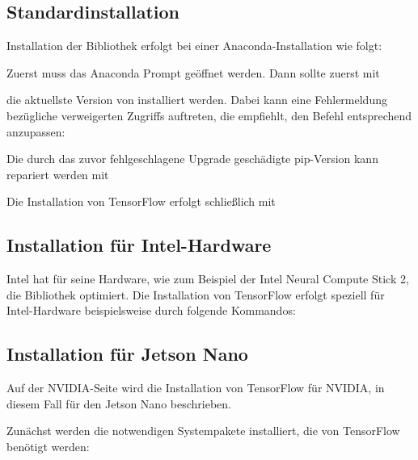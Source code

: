 \subsection{Standardinstallation}



Installation der Bibliothek erfolgt bei einer Anaconda-Installation wie folgt:

Zuerst muss das Anaconda Prompt geöffnet werden. Dann sollte zuerst mit

\medskip 
{}
\medskip

die aktuellste Version von  installiert werden. Dabei kann eine Fehlermeldung bezügliche verweigerten Zugriffs auftreten, die empfiehlt, den Befehl entsprechend anzupassen:

\medskip
{}
\medskip

Die durch das zuvor fehlgeschlagene Upgrade geschädigte pip-Version kann repariert werden mit

\medskip
{}
\medskip

Die Installation von TensorFlow erfolgt schließlich mit

\medskip



\subsection{Installation für Intel-Hardware} %

Intel hat für seine Hardware, wie zum Beispiel der Intel Neural Compute Stick 2, die Bibliothek 
optimiert. Die Installation von TensorFlow erfolgt speziell 
für Intel-Hardware beispielsweise durch folgende Kommandos:

\medskip



\medskip


\subsection{Installation für Jetson Nano}
Auf der NVIDIA-Seite wird die Installation von TensorFlow für NVIDIA, in diesem Fall für den Jetson Nano beschrieben.\cite{NVIDIA.27.10.2020}

Zunächst werden die notwendigen Systempakete installiert, die von TensorFlow benötigt werden:

